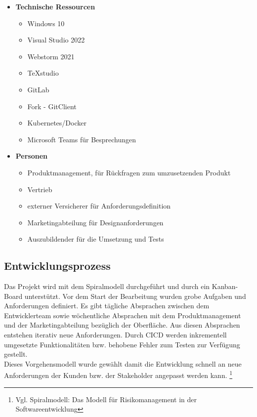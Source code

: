 \begin{itemize}
	\item \textbf{Technische Ressourcen}
	\begin{itemize}
		\item Windows 10
		\item Visual Studio 2022
		\item Webstorm 2021
		\item TeXstudio
		\item GitLab
		\item Fork - GitClient
		\item Kubernetes/Docker
		\item Microsoft Teams für Besprechungen
	\end{itemize}
	\item \textbf{Personen}
	\begin{itemize}
	 	\item Produktmanagement, für Rückfragen zum umzusetzenden Produkt
	 	\item Vertrieb
	 	\item externer Versicherer für Anforderungsdefinition
		\item Marketingabteilung für Designanforderungen
		\item Auszubildender für die Umsetzung und Tests
	\end{itemize}
\end{itemize}

\subsection{Entwicklungsprozess}
\label{entwicklungsprozess}
Das Projekt wird mit dem Spiralmodell durchgeführt und durch ein Kanban-Board unterstützt. Vor dem Start der Bearbeitung wurden grobe Aufgaben und Anforderungen definiert. Es gibt tägliche Absprachen zwischen dem Entwicklerteam sowie wöchentliche Absprachen mit dem Produktmanagement und der Marketingabteilung bezüglich der Oberfläche. Aus diesen Absprachen entstehen iterativ neue Anforderungen. Durch \ac{CICD} werden inkrementell umgesetzte Funktionalitäten bzw. behobene Fehler zum Testen zur Verfügung gestellt. \\
Dieses Vorgehensmodell wurde gewählt damit die Entwicklung schnell an neue Anforderungen der Kunden bzw. der Stakeholder angepasst werden kann. \footnote{Vgl.\cite{Spiralmodell19} Spiralmodell: Das Modell für Risikomanagement in der Softwareentwicklung}
